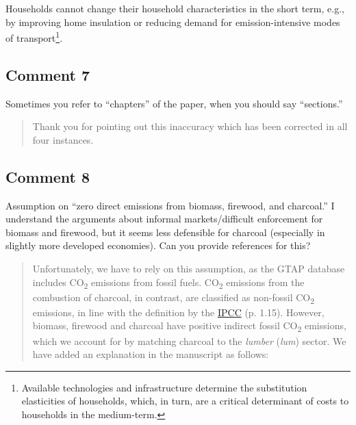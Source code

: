 \documentclass[11pt]{article}
\newenvironment{response}
{\begin{quote}\color{black}}
{\end{quote}}
\begin{document}
\begin{revisionbox}
    Households cannot change their household characteristics in the short term, e.g., by improving home insulation or reducing demand for emission-intensive modes of transport\footnote{Available technologies and infrastructure determine the substitution elasticities of households, which, in turn, are a critical determinant of costs to households in the medium-term.}.
\end{revisionbox}

\subsection*{Comment 7}\label{comment_R2_7}

\begin{commentbox}
    Sometimes you refer to “chapters” of the paper, when you should say “sections.”
\end{commentbox}

\begin{response}
    Thank you for pointing out this inaccuracy which has been corrected in all four instances.
\end{response}

\subsection*{Comment 8}\label{comment_R2_8}

\begin{commentbox}
    Assumption on “zero direct emissions from biomass, firewood, and charcoal.” I understand the arguments about informal markets/difficult enforcement for biomass and firewood, but it seems less defensible for charcoal (especially in slightly more developed economies). Can you provide references for this?
\end{commentbox}

\begin{response}
    Unfortunately, we have to rely on this assumption, as the GTAP database includes CO\textsubscript{2} emissions from fossil fuels. CO\textsubscript{2} emissions from the combustion of charcoal, in contrast, are classified as non-fossil CO\textsubscript{2} emissions, in line with the definition by the \href{https://www.ipcc-nggip.iges.or.jp/public/2006gl/pdf/2_Volume2/V2_1_Ch1_Introduction.pdf}{IPCC} (p. 1.15). However, biomass, firewood and charcoal have positive indirect fossil CO\textsubscript{2} emissions, which we account for by matching charcoal to the \textit{lumber} (\textit{lum}) sector. We have added an explanation in the manuscript as follows:
\end{response}
\end{document}
